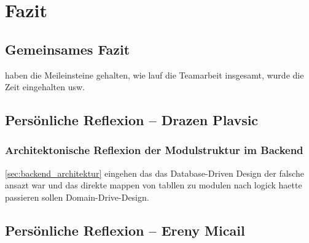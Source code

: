 \chapter{Fazit}

\section{Gemeinsames Fazit}
haben die Meileinsteine gehalten, wie lauf die Teamarbeit insgesamt, wurde die Zeit eingehalten usw.
\section{Persönliche Reflexion -- Drazen Plavsic}
\subsection*{Architektonische Reflexion der Modulstruktur im Backend}
\ref{sec:backend_architektur} eingehen das das Database-Driven Design der falsche ansazt war und das direkte mappen von tabllen zu modulen nach logick haette passieren sollen Domain-Drive-Design.
\section{Persönliche Reflexion -- Ereny Micail}
